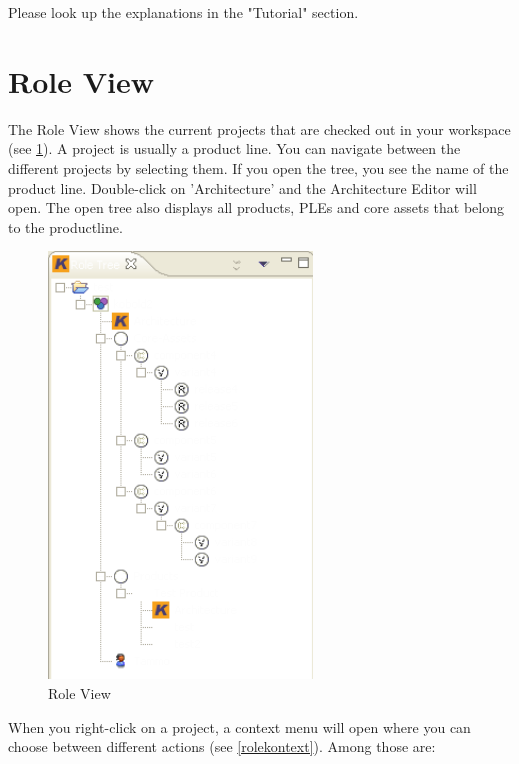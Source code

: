 Please look up the explanations in the "Tutorial" section.

\section{Role View}

The Role View shows the current projects that are checked out in your workspace 
(see \ref{roletree}).
A project is usually a product line. You can navigate between the 
different projects by selecting them. If you open the tree, you see the name
of the product line. Double-click on 'Architecture' and the Architecture Editor will open. The open tree also 
displays all products, PLEs and core assets that belong to the productline.

\begin{figure}[h!]
\begin{center}
\includegraphics[width=7cm]{roletree.png}
   \caption{Role View}
\label{roletree}
\end{center}
\end{figure}\par

When you right-click on a project, a context menu will open where you can choose 
between different actions (see \ref{rolekontext}). Among those are:

